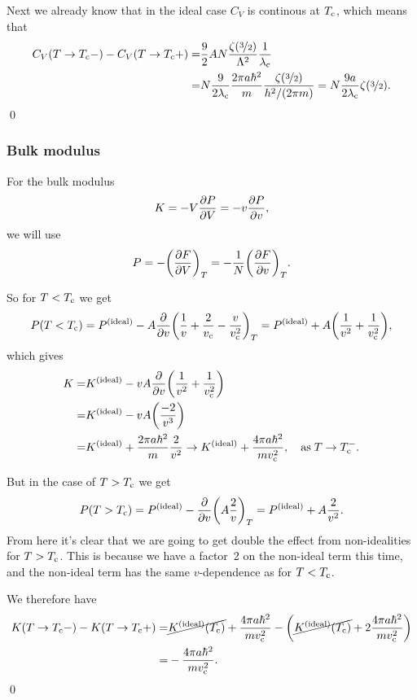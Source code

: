 \documentclass[11pt,letter, swedish, english
]{article}
\begin{document}
Next we already know that in the ideal case $C_V$ is continous at
$T_{\text{c}}$, which means that
\begin{equation}
\begin{aligned}
C_V(T\to T_{\text{c}}-)-C_V(T\to T_{\text{c}}+)
=&\frac{9}{2}AN\frac{\zeta(\nicefrac{3}{2})}{\Lambda^2}\frac{1}{\lambda_{\text{c}}}\\
=&N\frac{9}{2\lambda_{\text{c}}}\frac{2\pi a \hbar^2}{m}
\frac{\zeta(\nicefrac{3}{2})}{h^2/(2\pi m)}
=N\frac{9a}{2\lambda_{\text{c}}}\zeta(\nicefrac{3}{2}).
\end{aligned}
\end{equation}
\qed

\subsubsection{Bulk modulus}
For the bulk modulus
\begin{equation}
K=-V\pdv{P}{V}=-v\pdv{P}{v},
\end{equation}
we will use
\begin{equation}
P=-\qty(\pdv{F}{V})_T
=-\frac{1}{N}\qty(\pdv{F}{v})_T.
\end{equation}

So for $T<T_{\text{c}}$ we get
\begin{equation}\label{eq:3_P<Tc}
P(T<T_{\text{c}})=P^\text{{(ideal)}}-A\pdv{v}\qty(\frac{1}{v}+\frac{2}{v_{\text{c}}}-\frac{v}{v_{\text{c}}^2})_T
=P^\text{{(ideal)}}+A\qty(\frac{1}{v^2}+\frac{1}{v_{\text{c}}^2}),
\end{equation}
which gives
\begin{equation}
\begin{aligned}
K=&\ideal{K}-vA\pdv{v}\qty(\frac{1}{v^2}+\frac{1}{\vc^2})\\
=&\ideal{K}-vA\qty(\frac{-2}{v^3})\\
=&\ideal{K}+\frac{2\pi a\hbar^2}{m}\frac{2}{v^2}
\to \ideal{K}+\frac{4\pi a\hbar^2}{m\vc^2}
\qcomma\text{as}\; T\to\Tc^-.
\end{aligned}
\end{equation}

But in the case of $T>T_{\text{c}}$ we get
\begin{equation}\label{eq:3_P>Tc}
P(T>T_{\text{c}})=P^\text{{(ideal)}}-\pdv{v}\qty(A\frac{2}{v})_T
=P^\text{{(ideal)}}+A\frac{2}{v^2}.
\end{equation}
From here it's clear that we are going to get double the effect from
non-idealities for $T>T_{\text{c}}$. This is because we have a factor~2 on the non-ideal
term this time, and the non-ideal term has the same $v$-dependence as
for $T<T_{\text{c}}$.

We therefore have
\begin{equation}
\begin{aligned}
K(T\to T_{\text{c}}-)-K(T\to T_{\text{c}}+)
=&\cancel{K^\text{{(ideal)}}(T_{\text{c}})}+\frac{4\pi a\hbar^2}{mv_{\text{c}}^2}
-\qty(\cancel{K^\text{{(ideal)}}(T_{\text{c}})}+2\frac{4\pi a\hbar^2}{mv_{\text{c}}^2})\\
=&-\frac{4\pi a\hbar^2}{mv_{\text{c}}^2}.
\end{aligned}
\end{equation}
\qed
\end{document}
